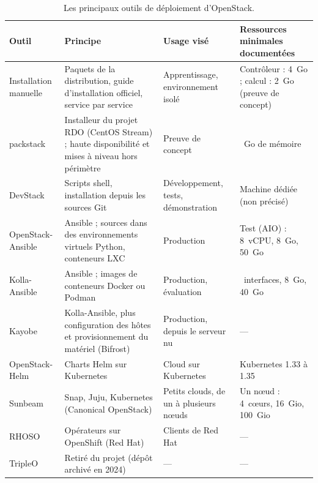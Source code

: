 \begin{table}[!ht]
\centering
\renewcommand{\arraystretch}{1.25}
\small
\begin{tabular}{@{}>{\raggedright\arraybackslash}p{2.5cm}>{\raggedright\arraybackslash}p{5.5cm}>{\raggedright\arraybackslash}p{3.4cm}>{\raggedright\arraybackslash}p{3.8cm}@{}}
\toprule
\textbf{Outil} & \textbf{Principe} & \textbf{Usage visé} & \textbf{Ressources minimales documentées} \\
\midrule
Installation manuelle & Paquets de la distribution, guide d'installation officiel, service par service & Apprentissage, environnement isolé & Contrôleur : 4~Go ; calcul : 2~Go (preuve de concept) \parencite{install-env} \\
\gls{packstack} & Installeur du projet RDO (CentOS Stream) ; haute disponibilité et mises à niveau hors périmètre & Preuve de concept & 16~Go de mémoire \parencite{packstack} \\
DevStack & Scripts shell, installation depuis les sources Git & Développement, tests, démonstration & Machine dédiée (non précisé) \parencite{devstack-index} \\
OpenStack-Ansible & Ansible ; sources dans des environnements virtuels Python, conteneurs LXC & Production & Test (AIO) : 8~vCPU, 8~Go, 50~Go \parencite{osa-aio} \\
Kolla-Ansible & Ansible ; images de conteneurs Docker ou Podman & Production, évaluation & 2~interfaces, 8~Go, 40~Go \parencite{kolla-ansible-quickstart} \\
Kayobe & Kolla-Ansible, plus configuration des hôtes et provisionnement du matériel (Bifrost) & Production, depuis le serveur nu & --- \parencite{kayobe-index} \\
OpenStack-Helm & Charts Helm sur Kubernetes & Cloud sur Kubernetes & Kubernetes 1.33 à 1.35 \parencite{helm-readme} \\
Sunbeam & Snap, Juju, Kubernetes (Canonical OpenStack) \parencite{sunbeam-multinode} & Petits clouds, de un à plusieurs nœuds & Un nœud : 4~cœurs, 16~Gio, 100~Gio \parencite{sunbeam-tuto} \\
RHOSO & Opérateurs sur OpenShift (Red Hat) & Clients de Red Hat & --- \parencite{rhoso-deploy} \\
TripleO & Retiré du projet (dépôt archivé en 2024) & --- & --- \parencite{tripleo-docs} \\
\bottomrule
\end{tabular}
\caption{Les principaux outils de déploiement d'OpenStack.}
\label{tab:dep-outils}
\end{table}


